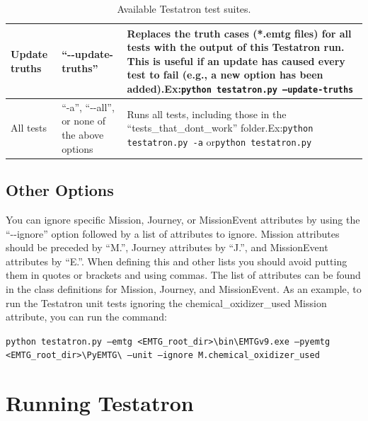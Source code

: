 \documentclass[11pt]{article}
\begin{document}
\begin{table}[H]
\begin{small}
\begin{tabularx}{\linewidth} { >{\arraybackslash} l >{\arraybackslash}p{17em} >{\arraybackslash} X}
			\hline
			Update truths & ``-{}-update-truths'' & Replaces the truth cases (*.emtg files) for all tests with the output of this Testatron run. This is useful if an update has caused every test to fail (e.g., a new option has been added).\newline\newline Ex:\newline\texttt{python testatron.py --update-truths} \\
			\hline
			All tests & ``-a'', ``-{}-all'', or none of the above options & Runs all tests, including those in the ``tests\_that\_dont\_work'' folder.\newline\newline Ex:\newline\texttt{python testatron.py -a} or\newline\texttt{python testatron.py} \\
			\hline 
		\end{tabularx} 
	\end{small}
	\caption{\label{tab:testatron_options}Available Testatron test suites.}
\end{table}

\subsection{Other Options}
\label{sec:other_options}

You can ignore specific Mission, Journey, or MissionEvent attributes by using the ``-{}-ignore'' option followed by a list of attributes to ignore. Mission attributes should be preceded by ``M.'', Journey attributes by ``J.'', and MissionEvent attributes by ``E.''. When defining this and other lists you should avoid putting them in quotes or brackets and using commas. The list of attributes can be found in the class definitions for Mission, Journey, and MissionEvent. As an example, to run the Testatron unit tests ignoring the chemical\_oxidizer\_used Mission attribute, you can run the command:

\texttt{python testatron.py --emtg <EMTG\_root\_dir>\textbackslash bin\textbackslash EMTGv9.exe --pyemtg <EMTG\_root\_di\newline\indent r>\textbackslash PyEMTG\textbackslash{} --unit --ignore M.chemical\_oxidizer\_used}

\section{Running Testatron}
\label{sec:running_testatron}
\end{document}
